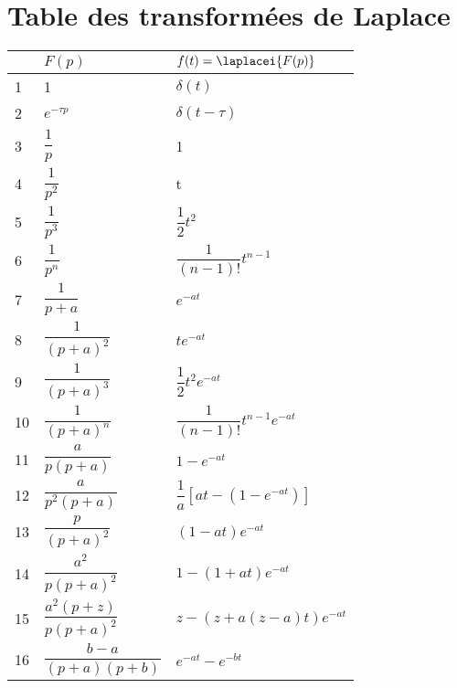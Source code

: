 \section{Table des transformées de Laplace}
\begin{table}[H]
\centering
{}
\begin{tabular}{@{}P{0.5cm}P{3.9cm}P{8.9cm}@{}}
\toprule
    & $F(p)$ & $f(t)=\laplacei{F(p)}$ \\
 & 1 & $\delta(t)$ \tabularnewline
    2 & $e^{-\tau p}$ & $\delta(t-\tau)$ \tabularnewline
    3 & $\dfrac{1}{p}$ & 1 \tabularnewline
    4 & $\dfrac{1}{p^2}$ & t \tabularnewline
    5 & $\dfrac{1}{p^3}$ & $\dfrac{1}{2}t^2$ \tabularnewline
    6 & $\dfrac{1}{p^n}$ & $\dfrac{1}{(n-1)!}t^{n-1}$ \tabularnewline
    7 & $\dfrac{1}{p+a}$ & $e^{-at}$ \tabularnewline
    8 & $\dfrac{1}{(p+a)^2}$ & $te^{-at}$ \tabularnewline
    9 & $\dfrac{1}{(p+a)^3}$ & $\dfrac{1}{2}t^2e^{-at}$ \tabularnewline
    10 & $\dfrac{1}{(p+a)^n}$ & $\dfrac{1}{(n-1)!}t^{n-1}e^{-at}$ \tabularnewline
    11 & $\dfrac{a}{p(p+a)}$ & $1-e^{-at}$ \tabularnewline
    12 & $\dfrac{a}{p^2(p+a)}$ & $\dfrac{1}{a}\left[at-\left(1-e^{-at}\right)\right]$ \tabularnewline
    13 & $\dfrac{p}{(p+a)^2}$ & $(1-at)e^{-at}$ \tabularnewline
    14 & $\dfrac{a^2}{p(p+a)^2}$ & $1-(1+at)e^{-at}$ \tabularnewline
    15 & $\dfrac{a^2(p+z)}{p(p+a)^2}$ & $z-\left(z+a(z-a)t\right)e^{-at}$ \tabularnewline
    16 & $\dfrac{b-a}{(p+a)(p+b)}$ & $e^{-at}-e^{-bt}$ \tabularnewline
\bottomrule
\end{tabular}
\end{table}
